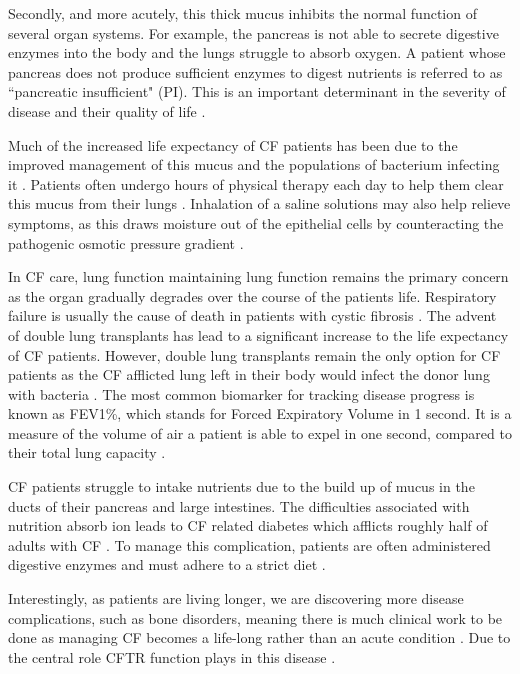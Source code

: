 Secondly, and more acutely, this thick mucus inhibits the normal function of several organ systems. For example, the pancreas is not able to secrete digestive enzymes into the body and the lungs struggle to absorb oxygen. A patient whose pancreas does not produce sufficient enzymes to digest nutrients is referred to as ``pancreatic insufficient" (PI). This is an important determinant in the severity of disease and their quality of life \cite{halloran2011,singh2017}.

Much of the increased life expectancy of CF patients has been due to the improved management of this mucus and the populations of bacterium infecting it \cite{mcbennett2022}. Patients often undergo hours of physical therapy each day to help them clear this mucus from their lungs \cite{zotero-3007}. Inhalation of a saline solutions may also help relieve symptoms, as this draws moisture out of the epithelial cells by counteracting the pathogenic osmotic pressure gradient \cite{wark2018}. 

In CF care, lung function maintaining lung function remains the primary concern as the organ gradually degrades over the course of the patients life. Respiratory failure is usually the cause of death in patients with cystic fibrosis \cite{kumar2018}. The advent of double lung transplants has lead to a significant increase to the life expectancy of CF patients. However, double lung transplants remain the only option for CF patients as the CF afflicted lung left in their body would infect the donor lung with bacteria \cite{mcbennett2022}. The most common biomarker for tracking disease progress is known as FEV1\%, which stands for Forced Expiratory Volume in 1 second. It is a measure of the volume of air a patient is able to expel in one second, compared to their total lung capacity \cite{}. 

CF patients struggle to intake nutrients due to the build up of mucus in the ducts of their pancreas and large intestines. The difficulties associated with nutrition absorb ion leads to CF related diabetes which afflicts roughly half of adults with CF \cite{Kayani2018}. To manage this complication, patients are often administered digestive enzymes and must adhere to a strict diet \cite{sullivan2017}. 

Interestingly, as patients are living longer, we are discovering more disease complications, such as bone disorders, meaning there is much clinical work to be done as managing CF becomes a life-long rather than an acute condition \cite{stalvey2013}. Due to the central role CFTR function plays in this disease  .

